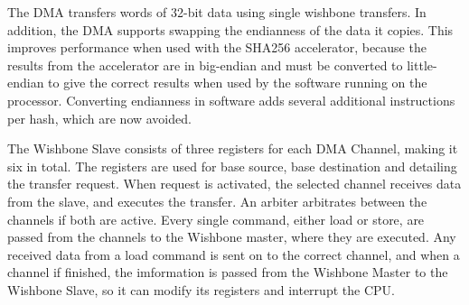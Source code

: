 The DMA transfers words of 32-bit data using single wishbone transfers.  In addition, the DMA supports
swapping the endianness of the data it copies. This improves performance when used with the SHA256
accelerator, because the results from the accelerator are in big-endian
and must be converted to little-endian to give the correct results when used by the software running on the processor.
Converting endianness in software adds several additional instructions per hash, which are now avoided.

%
The Wishbone Slave consists of three registers for each DMA Channel, making it six in total.
The registers are used for base source, base destination and detailing the transfer request.
When request is activated, the selected channel receives data from the slave, and executes the transfer.
An arbiter arbitrates between the channels if both are active.
Every single command, either load or store, are passed from the channels to the Wishbone master, where they are executed.
Any received data from a load command is sent on to the correct channel, and when a channel if finished, the imformation is passed from the Wishbone Master to the Wishbone Slave, so it can modify its registers and interrupt the CPU.


